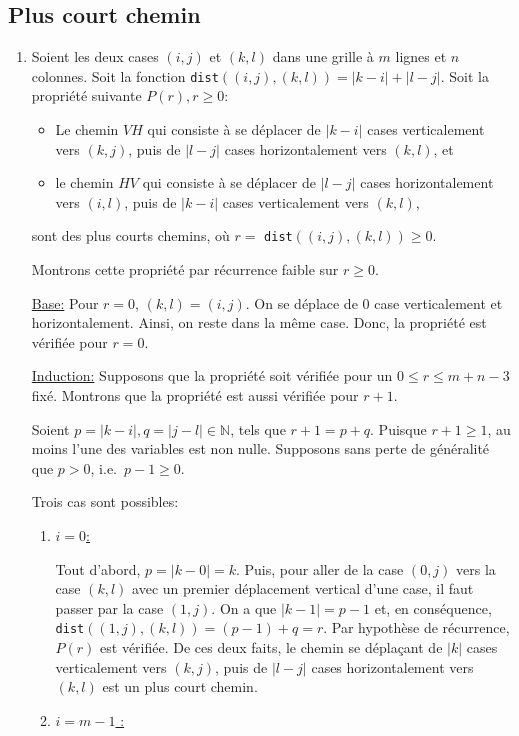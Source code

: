 \documentclass[12pt,a4paper]{article}
\begin{document}
\subsection*{Plus court chemin}
\begin{enumerate}
\item Soient les deux cases $(i,j)$ et $(k,l)$ dans une grille \`a $m$ 
lignes et $n$ colonnes. 
Soit la fonction \texttt{dist}$((i,j),(k,l))=|k-i|+|l-j|$. Soit la 
propri\'et\'e 
suivante $P(r), r \geq 0$:
\begin{itemize}
\item Le chemin $VH$ qui consiste \`a se d\'eplacer de $|k-i|$ cases 
verticalement vers $(k,j)$, puis de $|l-j|$ cases horizontalement vers $(k,l)$, 
et
\item le chemin $HV$ qui consiste \`a se d\'eplacer de $|l-j|$ cases 
horizontalement vers $(i,l)$, puis de $|k-i|$ cases verticalement vers $(k,l)$,
\end{itemize}
sont des plus courts chemins, o\`u $r=$ \texttt{dist}$((i,j),(k,l)) \geq 0$.

Montrons cette propri\'et\'e par r\'ecurrence faible sur $r \geq 0$.

\underline{Base:} Pour $r=0$, $(k,l)=(i,j)$. On se d\'eplace de $0$ 
case verticalement et horizontalement. Ainsi, on reste dans la m\^eme case. 
Donc, la propri\'et\'e est v\'erifi\'ee pour $r=0$.

\underline{Induction:} Supposons que la propri\'et\'e soit v\'erifi\'ee pour un 
$0 \leq r \leq m+n-3$ fix\'e.
Montrons que la propri\'et\'e est aussi v\'erifi\'ee pour $r+1$.

Soient $p=|k-i|, q=|j-l| \in \mathbb{N}$, tels que $r+1=p+q$. Puisque 
$r+1 \geq1$, au moins l'une des variables est non nulle. Supposons sans perte 
de g\'en\'eralit\'e que $p > 0$, i.e.\ $p-1 \geq 0$.

Trois cas sont possibles:
\begin{enumerate}
  \item \underline{$i=0$:} 

  Tout d'abord, $p=|k-0|=k$. Puis, pour aller de la case $(0,j)$ vers la case 
$(k,l)$ avec un premier   d\'eplacement vertical d'une case, il faut passer par 
la case $(1,j)$. On a que $|k-1|=p-1$ et, en 
cons\'equence, \texttt{dist}$((1,j),(k,l))=(p-1)+q=r$. Par 
hypoth\`ese de r\'ecurrence, $P(r)$ est v\'erifi\'ee. De ces deux faits, le 
chemin se d\'epla\c{c}ant de $|k|$ cases verticalement vers $(k,j)$, puis de 
$|l-j|$ cases horizontalement vers $(k,l)$ est un plus court chemin.
  \item \underline{$i=m-1$ :} 


\end{enumerate}
\end{enumerate}
\end{document}
